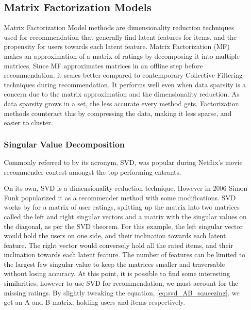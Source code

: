 \subsection{Matrix Factorization Models} \label{bg:sub:factorizationmodels}
Matrix Factorization Model methods are dimensionality reduction techniques used for recommendation that generally find latent features for items, and the propensity for users towards each latent feature.
Matrix Factorization (MF) makes an approximation of a matrix of ratings by decomposing it into multiple matrices.
Since MF approximates matrices in an offline step before recommendation, it scales better compared to contemporary Collective Filtering techniques during recommendation. It performs well even when data sparsity is a concern due to the matrix approximation and the dimensionality reduction.
As data sparsity grows in a set, the less accurate every method gets. Factorization methods counteract this by compressing the data, making it less sparse, and easier to cluster.

\subsubsection{Singular Value Decomposition}
Commonly referred to by its acronym, SVD, was popular during Netflix's movie recommender contest amongst the top performing entrants.

On its own, SVD is a dimensionality reduction technique. However in 2006 Simon Funk popularized it as a recommender method with some modifications.
SVD works by for a matrix of user ratings, splitting up the matrix into two matrices called the left and right singular vectors and a matrix with the singular values on the diagonal, as per the SVD theorem. For this example, the left singular vector would hold the users on one side, and their inclination towards each latent feature. The right vector would conversely hold all the rated items, and their inclination towards each latent feature.
The number of features can be limited to the largest few singular value to keep the matrices smaller and traversable without losing accuracy.
At this point, it is possible to find some interesting similarities, however to use SVD for recommendation, we must account for the missing ratings. By slightly tweaking the equation, \ref{eq:svd_AB_squeezing}, we get an A and B matrix, holding users and items respectively.

